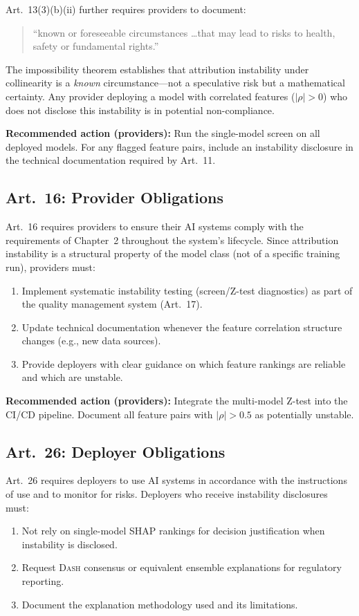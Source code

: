\documentclass{article}
\newcommand{\DASH}{\textsc{Dash}}
\begin{document}
Art.~13(3)(b)(ii) further requires providers to document:
\begin{quote}
``known or foreseeable circumstances \ldots that may lead to risks to health, safety or fundamental rights.''
\end{quote}
The impossibility theorem establishes that attribution instability under collinearity is a \emph{known} circumstance---not a speculative risk but a mathematical certainty. Any provider deploying a model with correlated features ($|\rho| > 0$) who does not disclose this instability is in potential non-compliance.

\textbf{Recommended action (providers):} Run the single-model screen on all deployed models. For any flagged feature pairs, include an instability disclosure in the technical documentation required by Art.~11.

\subsection*{Art.~16: Provider Obligations}

Art.~16 requires providers to ensure their AI systems comply with the requirements of Chapter~2 throughout the system's lifecycle. Since attribution instability is a structural property of the model class (not of a specific training run), providers must:
\begin{enumerate}
    \item Implement systematic instability testing (screen/Z-test diagnostics) as part of the quality management system (Art.~17).
    \item Update technical documentation whenever the feature correlation structure changes (e.g., new data sources).
    \item Provide deployers with clear guidance on which feature rankings are reliable and which are unstable.
\end{enumerate}

\textbf{Recommended action (providers):} Integrate the multi-model Z-test into the CI/CD pipeline. Document all feature pairs with $|\rho| > 0.5$ as potentially unstable.

\subsection*{Art.~26: Deployer Obligations}

Art.~26 requires deployers to use AI systems in accordance with the instructions of use and to monitor for risks. Deployers who receive instability disclosures must:
\begin{enumerate}
    \item Not rely on single-model SHAP rankings for decision justification when instability is disclosed.
    \item Request \DASH{} consensus or equivalent ensemble explanations for regulatory reporting.
    \item Document the explanation methodology used and its limitations.
\end{enumerate}
\end{document}
